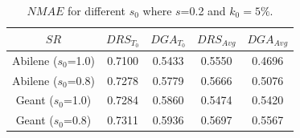 
\begin{table}
	\centering
		\begin{tabular}{| c | c | c | c | c |}
		\hline
       $SR$                 &    $DRS_{T_{0}}$  &  $DGA_{T_{0}}$  &  $DRS_{Avg}$ &  $DGA_{Avg}$ \\ \hline
      Abilene ($s_{0}$=1.0) & 0.7100 & 0.5433 & 0.5550 & 0.4696        \\ \hline
      Abilene ($s_{0}$=0.8) & 0.7278 & 0.5779 & 0.5666 & 0.5076        \\ \hline
      Geant ($s_{0}$=1.0)   & 0.7284 & 0.5860 & 0.5474 & 0.5420         \\ \hline
      Geant ($s_{0}$=0.8)   & 0.7311 & 0.5936 & 0.5697 & 0.5567         \\ \hline
    \end{tabular}
		\vspace{0.15cm}
	\caption{{$NMAE$ for different $s_{0}$ where $s$=0.2 and $k_{0}=5\%$.}}
	\label{tab:NMAEDGA}
\end{table}

